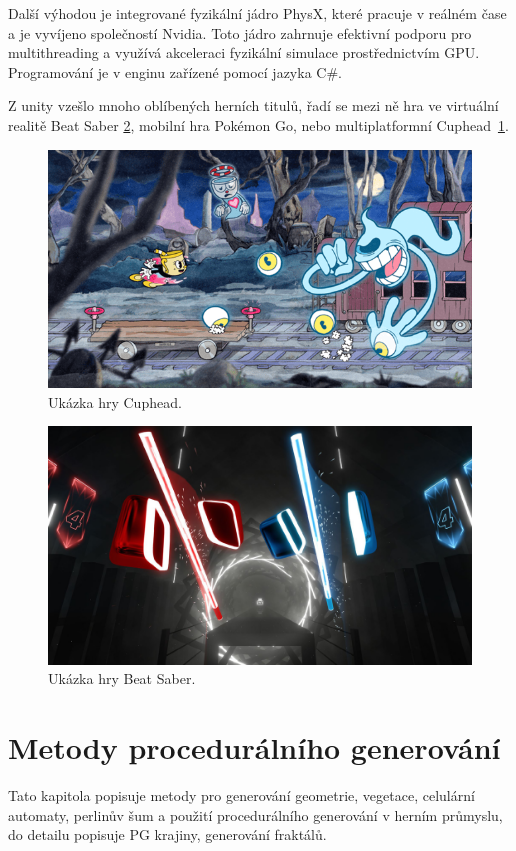 Další výhodou je integrované fyzikální jádro PhysX, které pracuje v reálném čase a je vyvíjeno společností Nvidia. Toto jádro zahrnuje efektivní podporu pro multithreading a využívá akceleraci fyzikální simulace prostřednictvím GPU. Programování je v enginu zařízené pomocí jazyka C\#.

Z unity vzešlo mnoho oblíbených herních titulů, řadí se mezi ně hra ve virtuální realitě Beat Saber \ref{fig:beatSaber}, mobilní hra Pokémon Go, nebo multiplatformní Cuphead~\ref{fig:cuphead}.
\begin{figure}[H]
	\centering
	\includegraphics[scale=0.61]{obrazky-figures/Cuphead.png}
	\caption{Ukázka hry Cuphead.}
	\label{fig:cuphead}
\end{figure}
\begin{figure}[H]
	\centering
	\includegraphics[scale=0.15]{obrazky-figures/BeatSaber.jpg}
	\caption{Ukázka hry Beat Saber.}
	\label{fig:beatSaber}
\end{figure}

\newpage

\chapter{Metody procedurálního generování}
\label{procedural}
Tato kapitola popisuje metody pro generování geometrie, vegetace, celulární automaty, perlinův šum a použití procedurálního generování v herním průmyslu, do detailu popisuje PG krajiny, generování fraktálů.

